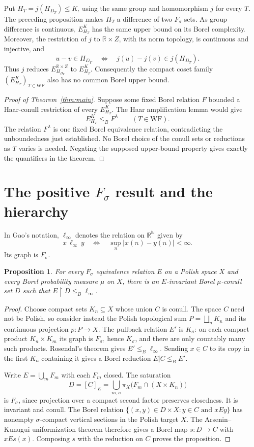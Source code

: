 \documentclass[11pt]{article}
\newtheorem{proposition}[theorem]{Proposition}
\theoremstyle{definition}
\theoremstyle{remark}
\newcommand{\R}{\mathbb R}
\newcommand{\N}{\mathbb N}
\newcommand{\WF}{\mathrm{WF}}
\begin{document}
Put $H_T=j(H_{D_T})\leq K$, using the same group and homomorphism $j$
for every $T$. The preceding proposition makes $H_T$ a difference of two
$F_\sigma$ sets. As group difference is continuous, $E_{H_T}^K$ has the
same upper bound on its Borel complexity. Moreover, the restriction of
$j$ to $\R\times Z$, with its norm topology, is continuous and injective,
and
\[
 u-v\in H_{D_T}\quad\Longleftrightarrow\quad
 j(u)-j(v)\in j(H_{D_T}).
\]
Thus $j$ reduces $E_{H_{D_T}}^{\R\times Z}$ to $E_{H_T}^K$.
Consequently the compact coset family $(E_{H_T}^K)_{T\in\WF}$ also
has no common Borel upper bound.

\begin{proof}[Proof of Theorem~\ref{thm:main}]
Suppose some fixed Borel relation $F$ bounded a Haar-conull restriction
of every $E_{H_T}^K$. The Haar amplification lemma would give
\[
 E_{H_T}^K\leq_B F^\lambda\qquad(T\in\WF).
\]
The relation $F^\lambda$ is one fixed Borel equivalence relation,
contradicting the unboundedness just established. No Borel choice of the
conull sets or reductions as $T$ varies is needed. Negating the supposed
upper-bound property gives exactly the quantifiers in the theorem.
\end{proof}

\section{The positive $F_\sigma$ result and the hierarchy}
In Gao's notation, $\ell_\infty$ denotes the relation on $\R^{\N}$ given by
\[
 x\,\ell_\infty\,y\quad\Longleftrightarrow\quad
 \sup_n|x(n)-y(n)|<\infty.
\]
Its graph is $F_\sigma$.

\begin{proposition}\label{prop:fsigma}
For every $F_\sigma$ equivalence relation $E$ on a Polish space $X$
and every Borel probability measure $\mu$ on $X$, there is an
$E$-invariant Borel $\mu$-conull set $D$ such that
$E\mathbin{\upharpoonright}D\leq_B\ell_\infty$.
\end{proposition}
\begin{proof}
Choose compact sets $K_n\subseteq X$ whose union $C$ is conull. The
space $C$ need not be Polish, so consider instead the Polish topological
sum $P=\bigsqcup_nK_n$ and its continuous projection $p:P\to X$.
The pullback relation $E'$ is $K_\sigma$: on each compact product
$K_n\times K_m$ its graph is $F_\sigma$, hence $K_\sigma$, and there
are only countably many such products. Rosendal's theorem gives
$E'\leq_B\ell_\infty$. Sending $x\in C$ to its copy in the first $K_n$
containing it gives a Borel reduction $E|C\leq_B E'$.

Write $E=\bigcup_mF_m$ with each $F_m$ closed. The saturation
\[
 D=[C]_E=\bigcup_{m,n}\pi_X\bigl(F_m\cap(X\times K_n)\bigr)
\]
is $F_\sigma$, since projection over a compact second factor preserves
closedness. It is invariant and conull. The Borel relation
$\{(x,y)\in D\times X:y\in C\text{ and }xEy\}$ has nonempty
$\sigma$-compact vertical sections in the Polish target $X$.
The Arsenin--Kunugui uniformization theorem therefore gives
a Borel map $s:D\to C$ with $xEs(x)$. Composing $s$ with the reduction
on $C$ proves the proposition.
\end{proof}
\end{document}
